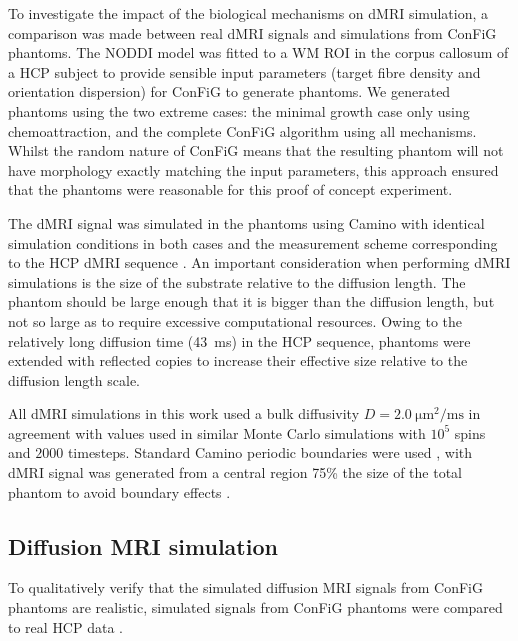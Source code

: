 To investigate the impact of the biological mechanisms on \ac{dMRI} simulation, a comparison was made between real \ac{dMRI} signals and simulations from \ac{ConFiG} phantoms. The \acs{NODDI} model \cite{Zhang2012} was fitted to a \ac{WM} ROI in the corpus callosum of a \ac{HCP} \cite{VanEssen2012} subject to provide sensible input parameters (target fibre density and orientation dispersion) for \ac{ConFiG} to generate phantoms. We generated phantoms using the two extreme cases: the minimal growth case only using chemoattraction, and the complete \ac{ConFiG} algorithm using all mechanisms. Whilst the random nature of \ac{ConFiG} means that the resulting phantom will not have morphology exactly matching the input parameters, this approach ensured that the phantoms were reasonable for this proof of concept experiment.

The \ac{dMRI} signal was simulated in the phantoms using Camino \cite{Cook2006,Hall2009} with identical simulation conditions in both cases and the measurement scheme corresponding to the \ac{HCP} \ac{dMRI} sequence \cite{Sotiropoulos2013a}. An important consideration when performing \ac{dMRI} simulations is the size of the substrate relative to the diffusion length. The phantom should be large enough that it is bigger than the diffusion length, but not so large as to require excessive computational resources. Owing to the relatively long diffusion time (\SI{43}{\milli\second}) in the \ac{HCP} sequence, phantoms were extended with reflected copies \cite{Lee2019a,Fieremans2018} to increase their effective size relative to the diffusion length scale.

All \ac{dMRI} simulations in this work used a bulk diffusivity $D=\SI{2.0}{\micro\metre\squared\per\milli\second}$ in agreement with values used in similar Monte Carlo simulations \cite{Hall2009,Nilsson2009,Rensonnet2017} with $10^5$ spins and $2000$ timesteps. Standard Camino periodic boundaries were used \cite{Hall2009}, with \ac{dMRI} signal was generated from a central region 75\% the size of the total phantom to avoid boundary effects \cite{Panagiotaki2010}.


\subsection{Diffusion \ac{MRI} simulation}
\label{sec:config_diffusion_sim}
To qualitatively verify that the simulated diffusion \ac{MRI} signals from \ac{ConFiG} phantoms are realistic, simulated signals from \ac{ConFiG} phantoms were compared to real \ac{HCP} data \cite{Sotiropoulos2013a,VanEssen2012}.


